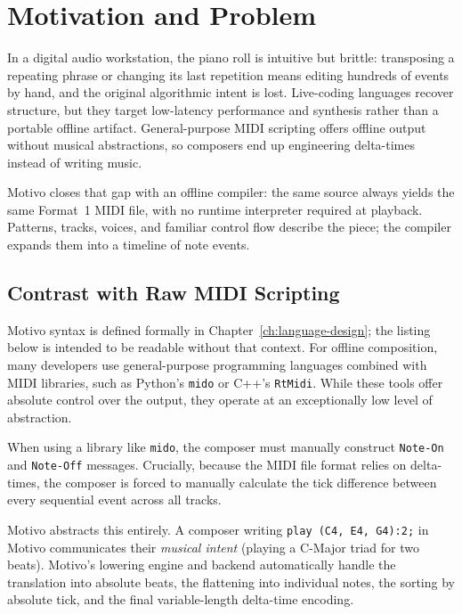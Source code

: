 \section{Motivation and Problem}\label{sec:motivation}

In a digital audio workstation, the piano roll is intuitive but brittle: transposing a repeating phrase or
changing its last repetition means editing hundreds of events by hand, and the original algorithmic intent is
lost. Live-coding languages recover structure, but they target low-latency performance and synthesis rather
than a portable offline artifact. General-purpose MIDI scripting offers offline output without musical
abstractions, so composers end up engineering delta-times instead of writing music.

Motivo closes that gap with an offline compiler: the same source always yields the same Format~1 MIDI file, with
no runtime interpreter required at playback. Patterns, tracks, voices, and familiar control flow describe the
piece; the compiler expands them into a timeline of note events.

\subsection{Contrast with Raw MIDI Scripting}\label{detail-subsec:raw-midi-scripting-contrast}

Motivo syntax is defined formally in Chapter~\ref{ch:language-design}; the listing below is intended to be readable
without that context.
For offline composition, many developers use general-purpose programming languages combined with MIDI libraries, such as
Python's \texttt{mido} or C++'s \texttt{RtMidi}.
While these tools offer absolute control over the output, they operate at an exceptionally low level of abstraction.

When using a library like \texttt{mido}, the composer must manually construct \texttt{Note-On} and \texttt{Note-Off}
messages.
Crucially, because the MIDI file format relies on delta-times, the composer is forced to manually calculate the tick
difference between every sequential event across all tracks.

Motivo abstracts this entirely.
A composer writing \texttt{play (C4, E4, G4):2;} in Motivo communicates their \textit{musical intent} (playing a
C-Major triad for two beats).
Motivo's lowering engine and backend automatically handle the translation into absolute beats, the flattening into
individual notes, the sorting by absolute tick, and the final variable-length delta-time encoding.

